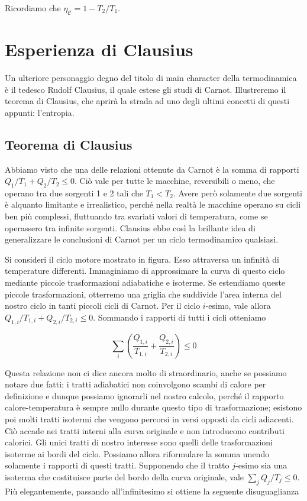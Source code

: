 \noindent Ricordiamo che $\eta_\mathcal{C} = 1 - T_2 / T_1$.



\section{Esperienza di Clausius}
Un ulteriore personaggio degno del titolo di main character
della termodinamica è il tedesco Rudolf Clausius, il quale estese
gli studi di Carnot. Illustreremo il teorema di Clausius, che
aprirà la strada ad uno degli ultimi concetti di questi appunti:
l'entropia.

\subsection{Teorema di Clausius}
Abbiamo visto che una delle relazioni ottenute da Carnot è la
somma di rapporti $Q_1/T_1 + Q_2/T_2 \leq 0$. Ciò vale per tutte
le macchine, reversibili o meno, che operano tra due sorgenti 1
e 2 tali che $T_1 < T_2$. Avere però solamente due sorgenti è
alquanto limitante e irrealistico, perché nella realtà le macchine
operano su cicli ben più complessi, fluttuando tra svariati valori
di temperatura, come se operassero tra infinite sorgenti. Clausius
ebbe così la brillante idea di generalizzare le conclusioni di
Carnot per un ciclo termodinamico qualsiasi.

Si consideri il ciclo motore mostrato in figura. Esso attraversa
un infinità di temperature differenti. Immaginiamo di approssimare
la curva di questo ciclo mediante piccole trasformazioni adiabatiche
e isoterme. Se estendiamo queste piccole trasformazioni, otterremo
una griglia che suddivide l'area interna del nostro ciclo in tanti
piccoli cicli di Carnot. Per il ciclo $i$-esimo, vale allora
$Q_{1,i}/T_{1,i} + Q_{2,i}/T_{2,i} \leq 0$. Sommando i rapporti di
tutti i cicli otteniamo

\[ \sum_i \left(\frac{Q_{1,i}}{T_{1,i}} + \frac{Q_{2,i}}{T_{2,i}}\right) \leq 0 \]

\noindent Questa relazione non ci dice ancora molto di straordinario,
anche se possiamo notare due fatti: i tratti adiabatici non coinvolgono
scambi di calore per definizione e dunque possiamo ignorarli nel
nostro calcolo, perché il rapporto calore-temperatura è sempre nullo
durante questo tipo di trasformazione; esistono poi molti tratti
isotermi che vengono percorsi in versi opposti da cicli adiacenti.
Ciò accade nei tratti interni alla curva originale e non introducono
contributi calorici. Gli unici tratti di nostro interesse sono
quelli delle trasformazioni isoterme ai bordi del ciclo. Possiamo
allora riformulare la somma unendo solamente i rapporti di questi
tratti. Supponendo che il tratto $j$-esimo sia una isoterma che
costituisce parte del bordo della curva originale, vale
$\sum_j Q_j/T_j \leq 0$. Più elegantemente, passando all'infinitesimo
si ottiene la seguente disuguaglianza

